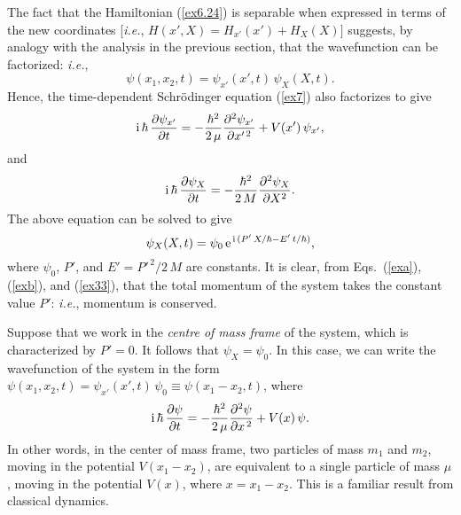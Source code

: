  The fact that the Hamiltonian (\ref{ex6.24}) is separable when expressed
 in terms of the new coordinates  [{\em i.e.},
 $H(x',X) = H_{x'}(x') + H_X(X)]$ suggests, by analogy with the analysis
 in the previous section, that the wavefunction can be factorized: {\em i.e.}, 
 \begin{equation}\label{exb}
 \psi(x_1,x_2,t) = \psi_{x'}(x',t)\,\psi_X(X,t).
 \end{equation}
 Hence, the time-dependent Schr\"{o}dinger equation (\ref{ex7})
 also factorizes to give
 \begin{equation}
 {\rm i}\,\hbar\,\frac{\partial\psi_{x'}}{\partial t} = -\frac{\hbar^2}{2\,\mu}
 \frac{\partial^2\psi_{x'}}{\partial x'^{\,2}} + V(x')\,\psi_{x'},
 \end{equation}
 and
 \begin{equation}
 {\rm i}\,\hbar\,\frac{\partial\psi_X}{\partial t} = -\frac{\hbar^2}{2\,M}\frac{\partial^2\psi_X}{\partial X^2}.
 \end{equation}
 The above equation can be solved to give
 \begin{equation}\label{ex33}
 \psi_X(X,t) = \psi_{0}\,{\rm e}^{\,{\rm i}\,(P'\,X/\hbar - E'\,t/\hbar)},
 \end{equation}
 where $\psi_0$, $P'$, and $E' = P'^{\,2}/2\,M$ are constants. It is clear, from Eqs.~(\ref{exa}),  (\ref{exb}),  and (\ref{ex33}), that
 the total momentum of the system takes the constant value $P'$:
 {\em i.e.}, momentum is conserved.
 
 Suppose that we work in the {\em centre of mass frame}\/ of the system, which is characterized by
 $P'=0$. It follows that
 $\psi_X=\psi_0$. In this case, we can write the wavefunction of the system in the form
 $\psi(x_1,x_2,t) = \psi_{x'}(x',t)\,\psi_0\equiv \psi(x_1-x_2,t)$, where 
 \begin{equation}
 {\rm i}\,\hbar\,\frac{\partial\psi}{\partial t} = -\frac{\hbar^2}{2\,\mu}
 \frac{\partial^2\psi}{\partial x^{\,2}} + V(x)\,\psi.
 \end{equation}
 In other words, in the center of mass frame, two particles of mass $m_1$
 and $m_2$, moving in the potential $V(x_1-x_2)$, are equivalent
 to a single particle of mass $\mu$, moving in the potential $V(x)$,
 where $x=x_1-x_2$. This is a familiar result from classical dynamics.

